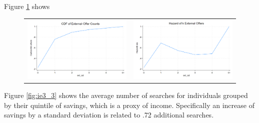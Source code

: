\documentclass[12pt]{article}
\begin{document}
Figure \ref{fig:ie3_2} shows 


\begin{figure}[H]
\caption{}
 \label{fig:ie3_2}
\centering{}%
\begin{tabular}{cc}
\includegraphics[scale=0.27]{figures/IE3_CDF_number_extoffers.png} &\includegraphics[scale=0.27]{figures/IE3_hazard_number_extoffers.png}
\end{tabular}
\end{figure}



Figure \ref{fig:ie3_3} shows the average number of searches for individuals grouped by their quintile of savings, which is a proxy of income. Specifically an increase of savings by a standard deviation is related to .72 additional searches. 
\end{document}
